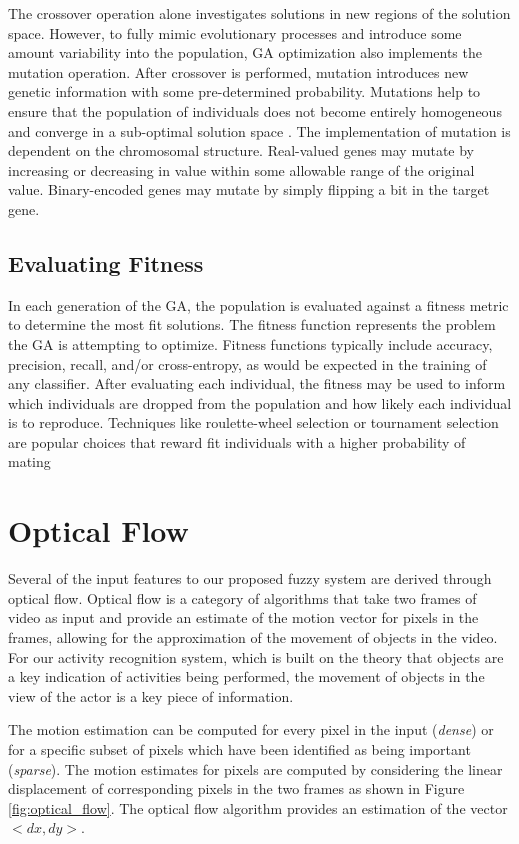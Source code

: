 \documentclass[12pt]{report}
\begin{document}
The crossover operation alone investigates solutions in new regions of the solution space. However, to fully mimic evolutionary processes and introduce some amount variability into the population, GA optimization also implements the mutation operation. After crossover is performed, mutation introduces new genetic information with some pre-determined probability. Mutations help to ensure that the population of individuals does not become entirely homogeneous and converge in a sub-optimal solution space \cite{holland1992genetic}. The implementation of mutation is dependent on the chromosomal structure. Real-valued genes may mutate by increasing or decreasing in value within some allowable range of the original value. Binary-encoded genes may mutate by simply flipping a bit in the target gene.

\subsection{Evaluating Fitness}
In each generation of the GA, the population is evaluated against a fitness metric to determine the most fit solutions. The fitness function represents the problem the GA is attempting to optimize. Fitness functions typically include accuracy, precision, recall, and/or cross-entropy, as would be expected in the training of any classifier. After evaluating each individual, the fitness may be used to inform which individuals are dropped from the population and how likely each individual is to reproduce. Techniques like roulette-wheel selection or tournament selection are popular choices that reward fit individuals with a higher probability of mating \cite{Zhong2005ComparisonAlgorithms}



\section{Optical Flow}
Several of the input features to our proposed fuzzy system are derived through optical flow. Optical flow is a category of algorithms that take two frames of video as input and provide an estimate of the motion vector for pixels in the frames, allowing for the approximation of the movement of objects in the video. For our activity recognition system, which is built on the theory that objects are a key indication of activities being performed, the movement of objects in the view of the actor is a key piece of information.

The motion estimation can be computed for every pixel in the input (\emph{dense}) or for a specific subset of pixels which have been identified as being important (\emph{sparse}). The motion estimates for pixels are computed by considering the linear displacement of corresponding pixels in the two frames as shown in Figure \ref{fig:optical_flow}. The optical flow algorithm provides an estimation of the vector $<dx, dy>$.
\end{document}
